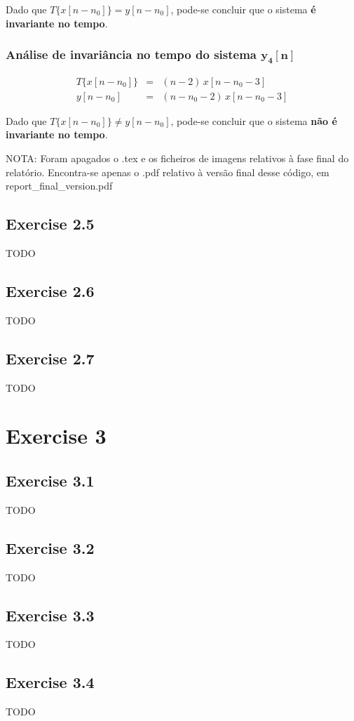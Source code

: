 \documentclass[a4paper]{article}
\begin{document}
\noindent Dado que $T\{x[n - n_{0}]\} = y[n - n_ {0}]$, pode-se concluir que o sistema \textbf{é invariante no tempo}.

\subsubsection{Análise de invariância no tempo do sistema $\mathbf{y_{4}[n]}$}
\begin{eqnarray}
	T\{x[n - n_{0}]\}	& = & (n - 2) \, x[n - n_{0} - 3] \\
	y[n - n_ {0}]		& = & (n - n_{0} - 2) \, x[n - n_{0} - 3]
\end{eqnarray}

\noindent Dado que $T\{x[n - n_{0}]\} \neq y[n - n_ {0}]$, pode-se concluir que o sistema \textbf{não é invariante no tempo}.

\begin{center}
	NOTA: Foram apagados o .tex e os ficheiros de imagens relativos à fase final do relatório. Encontra-se apenas o .pdf relativo à versão final desse código, em report_final_version.pdf
\end{center}

\subsection{Exercise 2.5}
\noindent TODO %

\subsection{Exercise 2.6}
\noindent TODO %

\subsection{Exercise 2.7}
\noindent TODO %

\section{Exercise 3}
\subsection{Exercise 3.1}
\noindent TODO %

\subsection{Exercise 3.2}
\noindent TODO %

\subsection{Exercise 3.3}
\noindent TODO %

\subsection{Exercise 3.4}
\noindent TODO %
\end{document}
